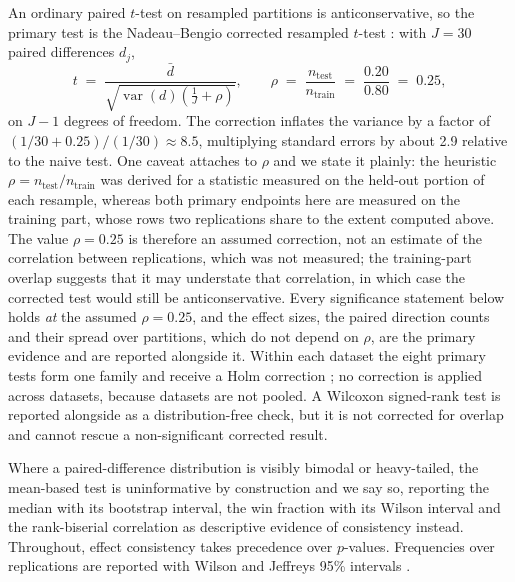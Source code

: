 An ordinary paired $t$-test on resampled partitions is anticonservative, so the primary test is the Nadeau--Bengio
corrected resampled $t$-test \citep{nadeau2003inference}: with $J = 30$ paired differences $d_j$,
\begin{equation}
t \;=\; \frac{\bar d}{\sqrt{\operatorname{var}(d)\left(\tfrac{1}{J} + \rho\right)}}, \qquad
\rho \;=\; \frac{n_{\text{test}}}{n_{\text{train}}} \;=\; \frac{0.20}{0.80} \;=\; 0.25,
\label{eq:nb}
\end{equation}
on $J - 1$ degrees of freedom. The correction inflates the variance by a factor of
$(1/30 + 0.25)/(1/30) \approx 8.5$, multiplying standard errors by about 2.9 relative to the naive test. One caveat
attaches to $\rho$ and we state it plainly: the heuristic $\rho = n_{\text{test}}/n_{\text{train}}$ was derived for a
statistic measured on the held-out portion of each resample, whereas both primary endpoints here are measured on the
training part, whose rows two replications share to the extent computed above. The value $\rho = 0.25$ is therefore
an assumed correction, not an estimate of the correlation between replications, which was not measured; the
training-part overlap suggests that it may understate that correlation, in which case the corrected test would
still be anticonservative. Every significance statement below holds \emph{at} the assumed $\rho = 0.25$, and the
effect sizes, the paired direction counts and their spread over partitions, which do not depend on $\rho$, are the
primary evidence and are reported alongside it. Within each
dataset the eight primary tests form one family and receive a Holm correction \citep{holm1979simple}; no correction
is applied across datasets, because datasets are not pooled. A Wilcoxon signed-rank test
\citep{wilcoxon1945individual} is reported alongside as a distribution-free check, but it is not corrected for overlap and cannot rescue a non-significant corrected result.

Where a paired-difference distribution is visibly bimodal or heavy-tailed, the mean-based test is uninformative by
construction and we say so, reporting the median with its bootstrap interval, the win fraction with its Wilson
interval and the rank-biserial correlation as descriptive evidence of consistency instead. Throughout, effect consistency takes precedence
over $p$-values. Frequencies over replications are reported with Wilson and Jeffreys 95\% intervals \citep{brown2001interval}.
